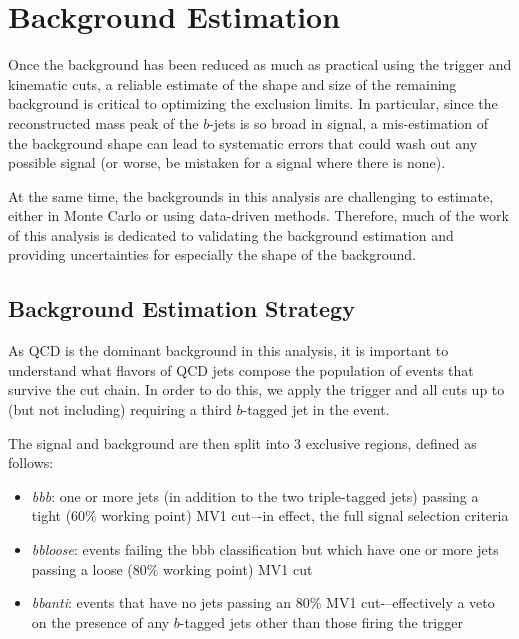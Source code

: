  

\chapter[Background Estimation]{Background Estimation}

Once the background has been reduced as much as practical using the trigger and kinematic cuts,
a reliable estimate of the shape and size of the remaining background is critical to optimizing
the exclusion limits.  In particular, since the reconstructed mass peak of the $b$-jets is so
broad in signal, a mis-estimation of the background shape can lead to systematic errors that
could wash out any possible signal (or worse, be mistaken for a signal where there is none).  

At the same time, the backgrounds in this analysis are challenging to estimate, either in Monte
Carlo or using data-driven methods.  Therefore, much of the work of this analysis is dedicated
to validating the background estimation and providing uncertainties for especially the shape 
of the background.  

\section{Background Estimation Strategy}
\label{sec:background_strategy}
As QCD is the dominant background in this analysis, it is important to understand
what flavors of QCD jets compose the population of events that survive the cut
chain.  In order to do this, we apply the trigger and all cuts up to (but not including)
requiring a third $b$-tagged jet in the event.

 The signal and background are then split into 3 exclusive regions, defined as follows:
\begin{itemize}
    \item \textit{bbb}: one or more jets (in addition to the two triple-tagged jets) passing a tight (60\% working point)
 MV1 cut–-in effect, the full signal selection criteria
    \item \textit{bbloose}: events failing the bbb classification but which have one or more jets passing a loose (80\%
 working point) MV1 cut
    \item \textit{bbanti}: events that have no jets passing an 80\% MV1 cut-–effectively a veto on the presence of any
 $b$-tagged jets other than those firing the trigger
\end{itemize}

